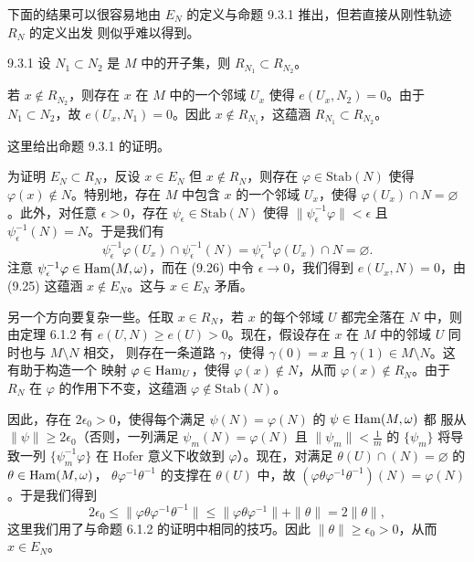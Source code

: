 下面的结果可以很容易地由 $E_N$ 的定义与命题 9.3.1 推出，但若直接从刚性轨迹 $R_N$ 的定义出发
则似乎难以得到。

\begin{wcor}{9.3.1}
设 $N_1\subset N_2$ 是 $M$ 中的开子集，则 $R_{N_1}\subset R_{N_2}$。
\end{wcor}

\begin{wproof}
若 $x\notin R_{N_2}$，则存在 $x$ 在 $M$ 中的一个邻域 $U_x$ 使得 $e(U_x,N_2)=0$。由于
$N_1\subset N_2$，故 $e(U_x,N_1)=0$。因此 $x\notin R_{N_1}$，这蕴涵
$R_{N_1}\subset R_{N_2}$。
\end{wproof}

这里给出命题 9.3.1 的证明。

\begin{wproof}[命题 9.3.1 的证明]
为证明 $E_N\subset R_N$，反设 $x\in E_N$ 但 $x\notin R_N$，则存在 $\varphi\in\mathrm{Stab}(N)$
使得 $\varphi(x)\notin N$。特别地，存在 $M$ 中包含 $x$ 的一个邻域 $U_x$，使得
$\varphi(U_x)\cap N=\varnothing$。此外，对任意 $\epsilon>0$，存在
$\psi_\epsilon\in\mathrm{Stab}(N)$ 使得 $\|\psi_\epsilon^{-1}\varphi\|<\epsilon$ 且
$\psi_\epsilon^{-1}(N)=N$。于是我们有
\begin{equation}
  \psi_\epsilon^{-1}\varphi(U_x)\cap\psi_\epsilon^{-1}(N)
  =\psi_\epsilon^{-1}\varphi(U_x)\cap N=\varnothing .
  \tag{9.26}
\end{equation}
注意 $\psi_\epsilon^{-1}\varphi\in\operatorname{Ham}(M,\omega)$，而在 (9.26) 中令 $\epsilon\to0$，我们得到
$e(U_x,N)=0$，由 (9.25) 这蕴涵 $x\notin E_N$。这与 $x\in E_N$ 矛盾。

另一个方向要复杂一些。任取 $x\in R_N$，若 $x$ 的每个邻域 $U$ 都完全落在 $N$ 中，则由定理 6.1.2
有 $e(U,N)\ge e(U)>0$。现在，假设存在 $x$ 在 $M$ 中的邻域 $U$ 同时也与 $M\setminus N$ 相交，
则存在一条道路 $\gamma$，使得 $\gamma(0)=x$ 且 $\gamma(1)\in M\setminus N$。这有助于构造一个
映射 $\varphi\in\operatorname{Ham}_U$，使得 $\varphi(x)\notin N$，从而 $\varphi(x)\notin R_N$。由于 $R_N$
在 $\varphi$ 的作用下不变，这蕴涵 $\varphi\notin\mathrm{Stab}(N)$。

因此，存在 $2\epsilon_0>0$，使得每个满足 $\psi(N)=\varphi(N)$ 的 $\psi\in\operatorname{Ham}(M,\omega)$ 都
服从 $\|\psi\|\ge2\epsilon_0$（否则，一列满足 $\psi_m(N)=\varphi(N)$ 且
$\|\psi_m\|<\frac1m$ 的 $\{\psi_m\}$ 将导致一列 $\{\psi_m^{-1}\varphi\}$ 在 Hofer 意义下收敛到
$\varphi$）。现在，对满足 $\theta(U)\cap(N)=\varnothing$ 的 $\theta\in\operatorname{Ham}(M,\omega)$，
$\theta\varphi^{-1}\theta^{-1}$ 的支撑在 $\theta(U)$ 中，故
$(\varphi\theta\varphi^{-1}\theta^{-1})(N)=\varphi(N)$。于是我们得到
\[
  2\epsilon_0\le\|\varphi\theta\varphi^{-1}\theta^{-1}\|
  \le\|\varphi\theta\varphi^{-1}\|+\|\theta\|=2\|\theta\|,
\]
这里我们用了与命题 6.1.2 的证明中相同的技巧。因此 $\|\theta\|\ge\epsilon_0>0$，从而
$x\in E_N$。
\end{wproof}
